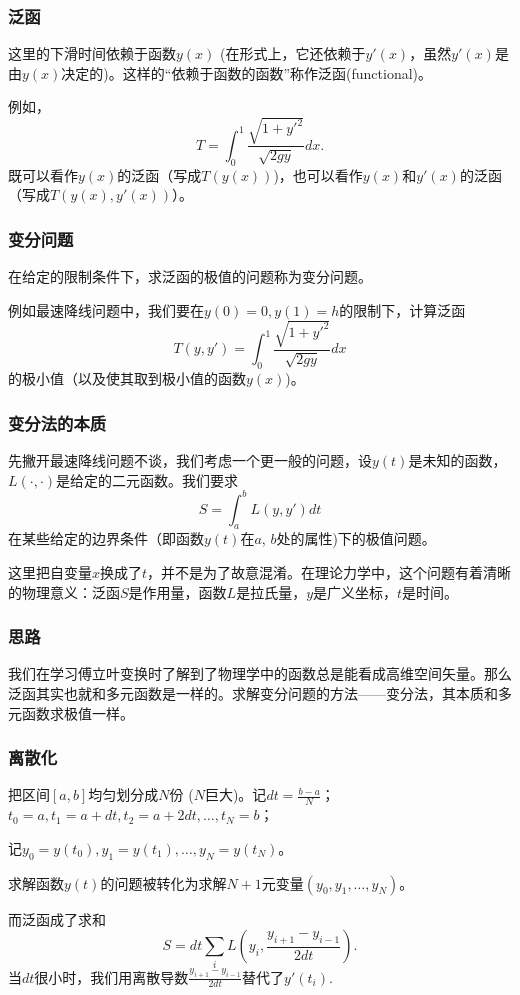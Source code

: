 \documentclass[CJK]{beamer}
\begin{document}
\begin{frame}
  \frametitle{泛函}
  这里的下滑时间依赖于函数$y(x)$ (在形式上，它还依赖于$y'(x)$，虽然$y'(x)$是由$y(x)$决定的)。这样的“依赖于函数的函数”称作{\blue 泛函(functional)}。

  \skiplines

  例如，
  $$T =  \int_0^1 \frac{\sqrt{1+y'^2}}{\sqrt{2gy}}dx. $$
  既可以看作$y(x)$的泛函（写成$T(y(x))$)，也可以看作$y(x)$和$y'(x)$的泛函（写成$T(y(x), y'(x))$）。
\end{frame}


\begin{frame}
  \frametitle{变分问题}
 在给定的限制条件下，求泛函的极值的问题称为{\blue 变分问题}。

  \skiplines

  例如最速降线问题中，我们要在$y(0)=0, y(1)=h$的限制下，计算泛函
  $$T(y, y') = \int_0^1 \frac{\sqrt{1+y'^2}}{\sqrt{2gy}}dx$$
  的极小值（以及使其取到极小值的函数$y(x)$)。
\end{frame}


\begin{frame}
  \frametitle{变分法的本质}
  先撇开最速降线问题不谈，我们考虑一个更一般的问题，设$y(t)$是未知的函数，$L(\cdot,\cdot)$是给定的二元函数。我们要求
  $$ S = \int_a^b L(y, y') dt $$
  在某些给定的边界条件（即函数$y(t)$在$a$, $b$处的属性)下的极值问题。

  {\blue 这里把自变量$x$换成了$t$，并不是为了故意混淆。在理论力学中，这个问题有着清晰的物理意义：泛函$S$是作用量，函数$L$是拉氏量，$y$是广义坐标，$t$是时间。}
  
\end{frame}


\begin{frame}
  \frametitle{思路}
  我们在学习傅立叶变换时了解到了物理学中的函数总是能看成高维空间矢量。那么泛函其实也就和多元函数是一样的。求解变分问题的方法——变分法，其本质和多元函数求极值一样。
\end{frame}


\begin{frame}
  \frametitle{离散化}
  把区间$[a,b]$均匀划分成$N$份 ($N$巨大)。记$dt=\frac{b-a}{N}$； $t_0=a, t_1=a+dt, t_2=a+2dt, \ldots, t_N=b$；

  记$y_0=y(t_0), y_1=y(t_1),\ldots, y_N=y(t_N)$。

  求解函数$y(t)$的问题被转化为求解$N+1$元变量$(y_0,y_1,\ldots,y_N)$。

  而泛函成了求和
  $$ S = dt\sum_i L\left(y_i, \frac{y_{i+1}-y_{i-1}}{2 dt}\right). $$
  当$dt$很小时，我们用离散导数$\frac{y_{i+1}-y_{i-1}}{2 dt}$替代了$y'(t_i)$.
\end{frame}
\end{document}
